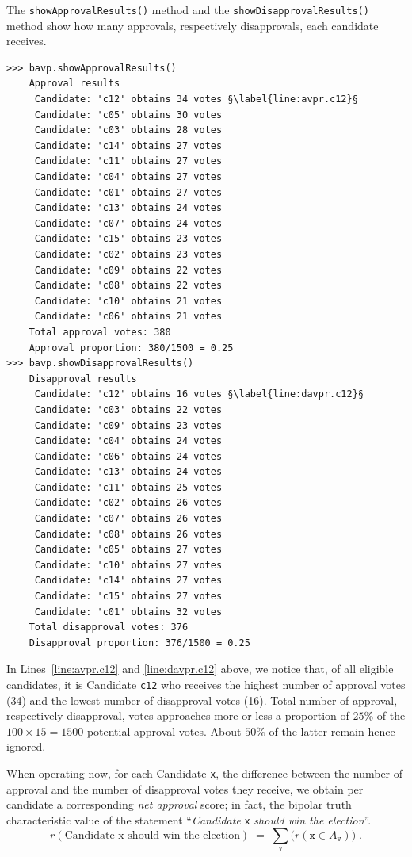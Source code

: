 The \texttt{showApprovalResults()} method and the \texttt{showDisapproval\-Re\-sults()} method show how many approvals, respectively disapprovals, each candidate receives.
\begin{lstlisting}
>>> bavp.showApprovalResults()
    Approval results
     Candidate: 'c12' obtains 34 votes §\label{line:avpr.c12}§
     Candidate: 'c05' obtains 30 votes
     Candidate: 'c03' obtains 28 votes
     Candidate: 'c14' obtains 27 votes
     Candidate: 'c11' obtains 27 votes
     Candidate: 'c04' obtains 27 votes
     Candidate: 'c01' obtains 27 votes
     Candidate: 'c13' obtains 24 votes
     Candidate: 'c07' obtains 24 votes
     Candidate: 'c15' obtains 23 votes
     Candidate: 'c02' obtains 23 votes
     Candidate: 'c09' obtains 22 votes
     Candidate: 'c08' obtains 22 votes
     Candidate: 'c10' obtains 21 votes
     Candidate: 'c06' obtains 21 votes
    Total approval votes: 380
    Approval proportion: 380/1500 = 0.25
>>> bavp.showDisapprovalResults()
    Disapproval results
     Candidate: 'c12' obtains 16 votes §\label{line:davpr.c12}§
     Candidate: 'c03' obtains 22 votes
     Candidate: 'c09' obtains 23 votes
     Candidate: 'c04' obtains 24 votes
     Candidate: 'c06' obtains 24 votes
     Candidate: 'c13' obtains 24 votes
     Candidate: 'c11' obtains 25 votes
     Candidate: 'c02' obtains 26 votes
     Candidate: 'c07' obtains 26 votes
     Candidate: 'c08' obtains 26 votes
     Candidate: 'c05' obtains 27 votes
     Candidate: 'c10' obtains 27 votes
     Candidate: 'c14' obtains 27 votes
     Candidate: 'c15' obtains 27 votes
     Candidate: 'c01' obtains 32 votes
    Total disapproval votes: 376
    Disapproval proportion: 376/1500 = 0.25
\end{lstlisting}

In Lines~\ref{line:avpr.c12} and \ref{line:davpr.c12} above, we notice that, of all eligible candidates, it is Candidate \texttt{c12} who receives the highest number of approval votes (34) and the lowest number of disapproval votes (16). Total number of approval, respectively disapproval, votes approaches more or less a proportion of $25\%$ of the $100 \times 15 = 1500$ potential approval votes. About $50\%$ of the latter remain hence ignored. 

When operating now, for each Candidate \texttt{x}, the difference between the number of approval and the number of disapproval votes they receive, we obtain per candidate a corresponding \emph{net approval} score; in fact, the bipolar truth characteristic value of the statement ``\emph{Candidate} \texttt{x} \emph{should win the election}''.
\begin{equation}
r(\text{Candidate x should win the election}) \;=\; \sum_{\mathtt{v}} \big(r(\mathtt{x} \in A_{\mathtt{v}})\big)\;.
\end{equation}

